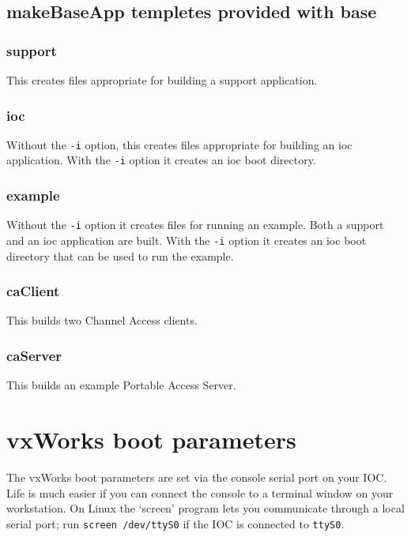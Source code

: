 \subsection{makeBaseApp templetes provided with base}

\subsubsection{support}

This creates files appropriate for building a support application.

\subsubsection{ioc}

Without the \verb|-i| option, this creates files appropriate for building an ioc application.
With the \verb|-i| option it creates an ioc boot directory.

\subsubsection{example}

Without the \verb|-i| option it creates files for running an example.
Both a support and an ioc application are built.
With the \verb|-i| option it creates an ioc boot directory that can be used to run the example.

\subsubsection{caClient}

This builds two Channel Access clients.

\subsubsection{caServer}

This builds an example Portable Access Server.

\section{vxWorks boot parameters}

The vxWorks boot parameters are set via the console serial port on your IOC.
Life is much easier if you can connect the console to a terminal window on your workstation.
On Linux the `screen' program lets you communicate through a local serial port; run \verb|screen /dev/ttyS0| if the IOC is connected to \verb|ttyS0|.

